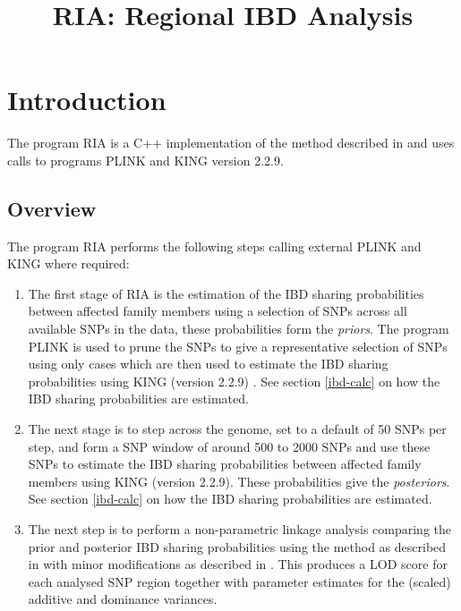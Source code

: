 \documentclass[a4paper,12pt]{article}
\begin{document}
\title{RIA: Regional IBD Analysis}
\date{}
\author{}
\maketitle
\newpage
\tableofcontents
\newpage
\section{Introduction}
\label{introduction}

The program RIA is a C++ implementation of the method described in \citet{nat:15} and uses calls to programs PLINK and KING version 2.2.9.
\subsection{Overview}
\label{overview}

The program RIA performs the following steps calling external PLINK and KING where required: 
\begin{enumerate}

\item The first stage of RIA is the estimation of the IBD sharing probabilities between affected family members using a selection of SNPs across all available SNPs in the data, these probabilities form the {\it priors}. The program PLINK \citet{purcell:etal:07} is used to prune the SNPs to give a representative selection of SNPs using only cases which are then used to estimate the IBD sharing probabilities using KING (version 2.2.9) \citet{manichaikul:etal:10}. See  section \ref{ibd-calc} on how the IBD sharing probabilities are estimated. 
\item The next stage is to step across the genome, set to a default of 50 SNPs per step, and form a SNP window of around 500 to 2000 SNPs and use these SNPs to estimate the IBD sharing probabilities between affected family members using KING (version 2.2.9). These probabilities give the {\it posteriors}. See  section \ref{ibd-calc} on how the IBD sharing probabilities are estimated. 
\item The next step is to perform a non-parametric linkage analysis comparing the prior and posterior IBD sharing probabilities using the method as described in \citet{cordell:etal:00} with minor modifications as described in \citet{nat:15}. This produces a LOD score for each analysed SNP region together with parameter estimates for the (scaled) additive and dominance variances.\end{enumerate}
\end{document}
